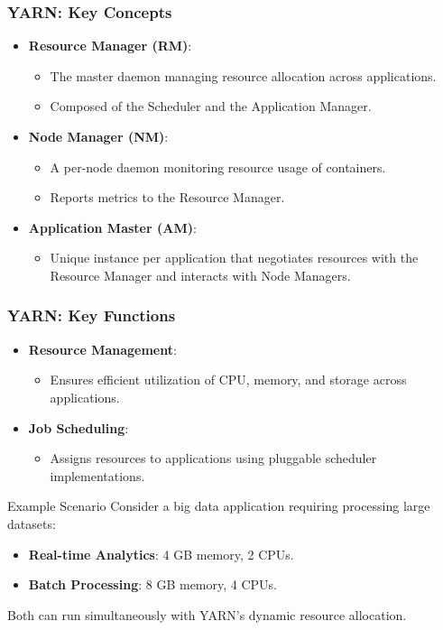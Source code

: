 \documentclass[aspectratio=169]{beamer}
\begin{document}
\begin{frame}[fragile]
    \frametitle{YARN: Key Concepts}
    \begin{itemize}
        \item \textbf{Resource Manager (RM)}: 
            \begin{itemize}
                \item The master daemon managing resource allocation across applications.
                \item Composed of the Scheduler and the Application Manager.
            \end{itemize}
        \item \textbf{Node Manager (NM)}: 
            \begin{itemize}
                \item A per-node daemon monitoring resource usage of containers.
                \item Reports metrics to the Resource Manager.
            \end{itemize}
        \item \textbf{Application Master (AM)}: 
            \begin{itemize}
                \item Unique instance per application that negotiates resources with the Resource Manager and interacts with Node Managers.
            \end{itemize}
    \end{itemize}
\end{frame}

\begin{frame}[fragile]
    \frametitle{YARN: Key Functions}
    \begin{itemize}
        \item \textbf{Resource Management}: 
            \begin{itemize}
                \item Ensures efficient utilization of CPU, memory, and storage across applications.
            \end{itemize}
        \item \textbf{Job Scheduling}: 
            \begin{itemize}
                \item Assigns resources to applications using pluggable scheduler implementations.
            \end{itemize}
    \end{itemize}
    
    \begin{block}{Example Scenario}
        Consider a big data application requiring processing large datasets:
        \begin{itemize}
            \item \textbf{Real-time Analytics}: 4 GB memory, 2 CPUs.
            \item \textbf{Batch Processing}: 8 GB memory, 4 CPUs.
        \end{itemize}
        Both can run simultaneously with YARN's dynamic resource allocation.
    \end{block}
\end{frame}
\end{document}
